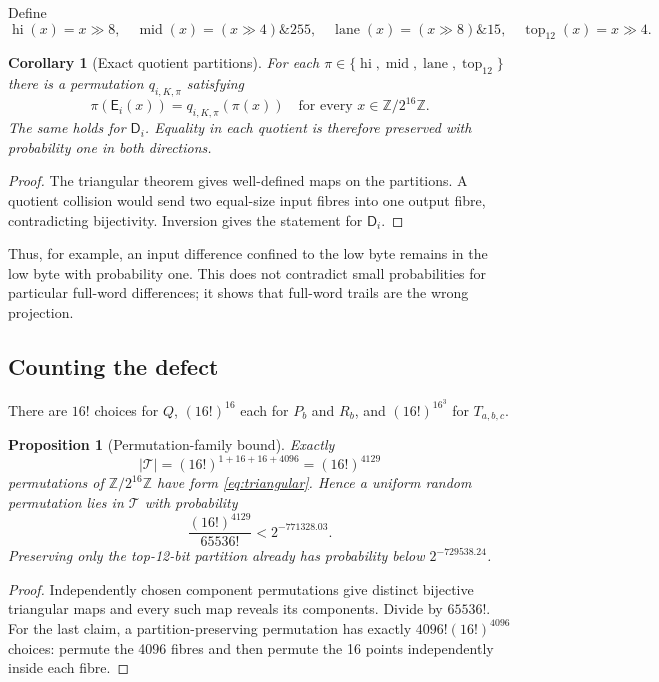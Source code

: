 \documentclass[10pt]{article}
\theoremstyle{plain}
\newtheorem{proposition}[theorem]{Proposition}
\newtheorem{corollary}[theorem]{Corollary}
\theoremstyle{definition}
\theoremstyle{remark}
\newcommand{\W}{\mathbb Z/2^{16}\mathbb Z}
\newcommand{\E}{\mathsf E}
\newcommand{\D}{\mathsf D}
\newcommand{\hi}{\operatorname{hi}}
\newcommand{\midb}{\operatorname{mid}}
\newcommand{\lane}{\operatorname{lane}}
\newcommand{\topx}{\operatorname{top}_{12}}
\begin{document}
Define
\[
\hi(x)=x\mathbin{\gg}8,\quad
\midb(x)=(x\mathbin{\gg}4)\mathbin{\&}255,\quad
\lane(x)=(x\mathbin{\gg}8)\mathbin{\&}15,\quad
\topx(x)=x\mathbin{\gg}4.
\]

\begin{corollary}[Exact quotient partitions]
\label{cor:quotients}
For each \(\pi\in\{\hi,\midb,\lane,\topx\}\) there is a permutation
\(q_{i,K,\pi}\) satisfying
\begin{equation}
\pi(\E_i(x))=q_{i,K,\pi}(\pi(x))\quad\text{for every }x\in\W.
\label{eq:quotient}
\end{equation}
The same holds for \(\D_i\).  Equality in each quotient is therefore
preserved with probability one in both directions.
\end{corollary}
\begin{proof}
The triangular theorem gives well-defined maps on the partitions.  A quotient
collision would send two equal-size input fibres into one output fibre,
contradicting bijectivity.  Inversion gives the statement for \(\D_i\).
\end{proof}

Thus, for example, an input difference confined to the low byte remains in the
low byte with probability one.  This does not contradict small probabilities
for particular full-word differences; it shows that full-word trails are the
wrong projection.

\subsection{Counting the defect}

There are \(16!\) choices for \(Q\), \((16!)^{16}\) each for \(P_b\) and
\(R_b\), and \((16!)^{16^3}\) for \(T_{a,b,c}\).
\begin{proposition}[Permutation-family bound]
\label{prop:count}
Exactly
\begin{equation}
|\mathcal T|=(16!)^{1+16+16+4096}=(16!)^{4129}
\end{equation}
permutations of \(\W\) have form \eqref{eq:triangular}.  Hence a uniform
random permutation lies in \(\mathcal T\) with probability
\[
\frac{(16!)^{4129}}{65536!}<2^{-771328.03}.
\]
Preserving only the top-12-bit partition already has probability below
\(2^{-729538.24}\).
\end{proposition}
\begin{proof}
Independently chosen component permutations give distinct bijective triangular maps
and every such map reveals its components.  Divide by \(65536!\).  For the
last claim, a partition-preserving permutation has exactly
\(4096!(16!)^{4096}\) choices: permute the 4096 fibres and then permute the 16
points independently inside each fibre.
\end{proof}
\end{document}

